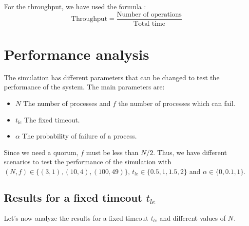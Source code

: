 \documentclass{article}
\begin{document}
For the throughput, we have used the formula :
$$
    \text{Throughput} = \frac{\text{Number of operations}}{\text{Total time}}
$$

\newpage

\section{Performance analysis}
The simulation has different parameters that can be changed to test the performance of the system. The main parameters are:

\begin{itemize}
    \item $N$ The number of processes and $f$ the number of processes which can fail.
    \item $t_{le}$ The fixed timeout.
    \item $\alpha$ The probability of failure of a process.
\end{itemize}

Since we need a quorum, $f$ must be less than $N/2$. Thus,
we have different scenarios to test the performance of the simulation
with $(N,f) \in \{(3,1),(10,4),(100,49)\}$, $t_{le} \in \{0.5,1,1.5,2\}$ and $\alpha \in \{0,0.1,1\}$.

\subsection{Results for a fixed timeout $t_{le}$}
Let's now analyze the results for a fixed timeout $t_{le}$ and different values of $N$.
\end{document}
